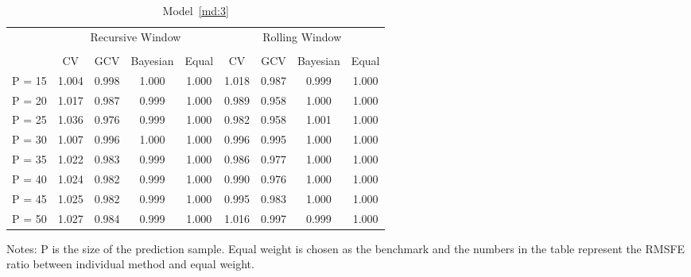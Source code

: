 \begin{table}
\caption{Model~\ref{md:3}} \label{tb:10}
\centering
\begin{adjustbox}{keepaspectratio}
\begin{threeparttable}
\begin{tabular}{lcccccccc}
\toprule
 & \multicolumn{4}{c}{Recursive Window} & \multicolumn{4}{c}{Rolling Window}\\%
\cmidrule(r){2-5}
\cmidrule(r){6-9}\\
       & CV & GCV & Bayesian & Equal & CV & GCV & Bayesian & Equal \\
P = 15 &1.004 &0.998 &1.000 & 1.000& 1.018& 0.987& 0.999& 1.000\\
P = 20 &1.017 &0.987 &0.999 & 1.000& 0.989& 0.958& 1.000& 1.000\\
P = 25 &1.036 &0.976 &0.999 & 1.000& 0.982& 0.958& 1.001& 1.000\\
P = 30 &1.007 &0.996 &1.000 & 1.000& 0.996& 0.995& 1.000& 1.000\\
P = 35 &1.022 &0.983 &0.999 & 1.000& 0.986& 0.977& 1.000& 1.000\\
P = 40 &1.024 &0.982 &0.999 & 1.000& 0.990& 0.976& 1.000& 1.000\\
P = 45 &1.025 &0.982 &0.999 & 1.000& 0.995& 0.983& 1.000& 1.000\\
P = 50 &1.027 &0.984 &0.999 & 1.000& 1.016& 0.997& 0.999& 1.000\\
\bottomrule
\end{tabular}
\begin{tablenotes} \footnotesize
Notes: $\mathrm{P}$ is the size of the prediction sample. Equal weight is chosen as the benchmark and the numbers in the table represent the RMSFE ratio between individual method and equal weight.
\end{tablenotes}
\end{threeparttable}
\end{adjustbox}
\end{table}

